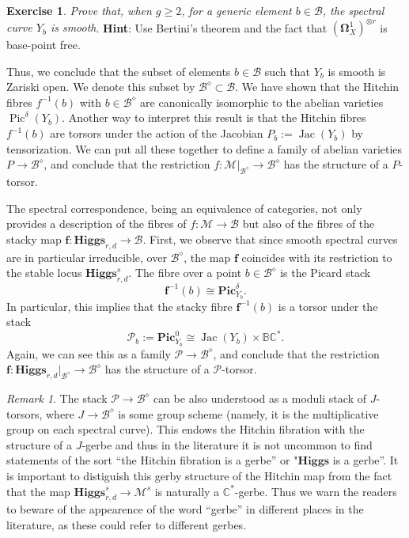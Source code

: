 \documentclass[12pt,a4paper]{amsbook}
\theoremstyle{remark} \newtheorem{rmk}[thm]{Remark}
\theoremstyle{definition} \newtheorem{defn}[thm]{Definition}
\theoremstyle{definition} \newtheorem{ex}[thm]{Example}
\theoremstyle{definition} \newtheorem{ej}{Exercise}
\newcommand{\C}{\mathbb C}
\newcommand{\bbB}{\mathbb B}
\newcommand{\cB}{\mathcal B}
\newcommand{\cM}{\mathcal M}
\newcommand{\cP}{\mathcal P}
\DeclareMathOperator{\Pic}{Pic}
\DeclareMathOperator{\Jac}{Jac}
\begin{document}
\begin{ej}
\textit{Prove that, when $g\geq 2$, for a generic element $b\in \cB$, the spectral curve $Y_b$ is smooth}. \textbf{Hint}: Use Bertini's theorem and the fact that $(\bm{\Omega}^1_X)^{\otimes r}$ is base-point free.
\end{ej}

Thus, we conclude that the subset of elements $b \in \cB$ such that $Y_b$ is smooth is Zariski open. We denote this subset by $\cB^\diamond \subset \cB$.
We have shown that the Hitchin fibres $f^{-1}(b)$ with $b\in \cB^\diamond$ are canonically isomorphic to the abelian varieties $\Pic^\delta(Y_b)$. Another way to interpret this result is that the Hitchin fibres $f^{-1}(b)$ are torsors under the action of the Jacobian $P_b:=\Jac(Y_b)$ by tensorization. We can put all these together to define a family of abelian varieties $P\rightarrow \cB^\diamond$, and conclude that the restriction $f:\cM|_{\cB^\diamond} \rightarrow \cB^\diamond$ has the structure of a $P$-torsor.

The spectral correspondence, being an equivalence of categories, not only provides a description of the fibres of $f:\cM\rightarrow \cB$ but also of the fibres of the stacky map $\bm{f}:\mathbf{Higgs}_{r,d}\rightarrow \cB$. First, we observe that since smooth spectral curves are in particular irreducible, over $\cB^\diamond$, the map $\bm{f}$ coincides with its restriction to the stable locus $\mathbf{Higgs}_{r,d}^s$. The fibre over a point $b \in \cB^\diamond$ is the Picard stack
\begin{equation*}
\bm{f}^{-1}(b) \cong \mathbf{Pic}^\delta_{Y_b}.
\end{equation*}
In particular, this implies that the stacky fibre $\bm{f}^{-1}(b)$ is a torsor under the stack
\begin{equation*}
\cP_b := \mathbf{Pic}^0_{Y_b} \cong \Jac(Y_b) \times \bbB \C^*.
\end{equation*}
Again, we can see this as a family $\cP \rightarrow \cB^{\diamond}$, and conclude that the restriction $\bm{f}:\mathbf{Higgs}_{r,d}|_{\cB^\diamond}\rightarrow \cB^\diamond$ has the structure of a $\cP$-torsor.

\begin{rmk}
The stack $\cP \rightarrow \cB^{\diamond}$ can be also understood as a moduli stack of $J$-torsors, where $J\rightarrow \cB^{\diamond}$ is some group scheme (namely, it is the multiplicative group on each spectral curve). This endows the Hitchin fibration with the structure of a $J$-gerbe and thus in the literature it is not uncommon to find statements of the sort ``the Hitchin fibration is a gerbe'' or "$\mathbf{Higgs}$ is a gerbe''. It is important to distiguish this gerby structure of the Hitchin map from the fact that the map $\mathbf{Higgs}^s_{r,d}\rightarrow \cM^s$ is naturally a $\C^*$-gerbe. Thus we warn the readers to beware of the appearence of the word ``gerbe'' in different places in the literature, as these could refer to different gerbes.
\end{rmk}
\end{document}
